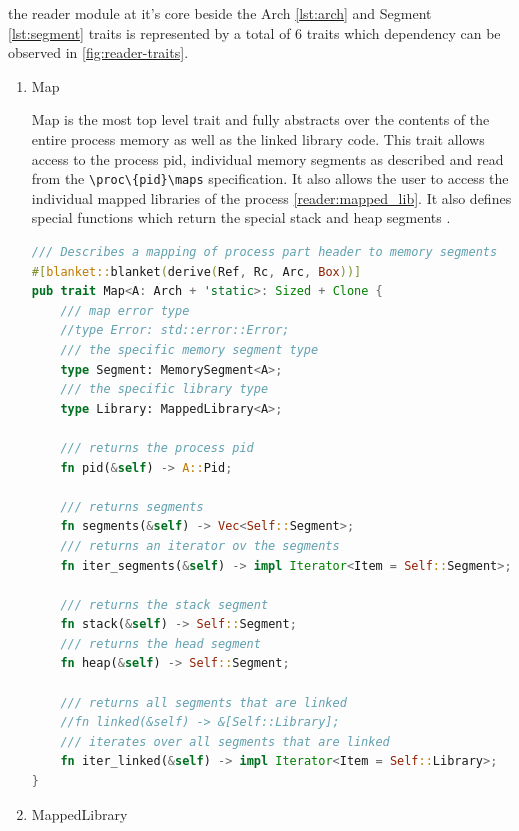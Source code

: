 the reader module at it's core beside the Arch \ref{lst:arch} and Segment \ref{lst:segment} traits is represented by a total of 6 traits which dependency can be observed in \ref{fig:reader-traits}.
\begin{enumerate}

    \item \label{reader:map}Map

Map is the most top level trait and fully abstracts over the contents of the entire process memory as well as the linked library code.
This trait allows access to the process pid, individual memory segments as described and read from the \verb|\proc\{pid}\maps| \cite{kerrisk_proc_pid_maps5_2024} specification.
It also allows the user to access the individual mapped libraries of the process \ref{reader:mapped_lib}.
It also defines special functions which return the special stack and heap segments \cite{TODO}.
    
\begin{lstlisting}[caption=\label{lst:map}"The Memory Map Trait definition", language=Rust]
 /// Describes a mapping of process part header to memory segments
#[blanket::blanket(derive(Ref, Rc, Arc, Box))]
pub trait Map<A: Arch + 'static>: Sized + Clone {
    /// map error type
    //type Error: std::error::Error;
    /// the specific memory segment type
    type Segment: MemorySegment<A>;
    /// the specific library type
    type Library: MappedLibrary<A>;

    /// returns the process pid
    fn pid(&self) -> A::Pid;

    /// returns segments
    fn segments(&self) -> Vec<Self::Segment>;
    /// returns an iterator ov the segments
    fn iter_segments(&self) -> impl Iterator<Item = Self::Segment>;

    /// returns the stack segment
    fn stack(&self) -> Self::Segment;
    /// returns the head segment
    fn heap(&self) -> Self::Segment;

    /// returns all segments that are linked
    //fn linked(&self) -> &[Self::Library];
    /// iterates over all segments that are linked
    fn iter_linked(&self) -> impl Iterator<Item = Self::Library>;
}   
\end{lstlisting}

 \item \label{reader:mapped_lib} MappedLibrary


\end{enumerate}
